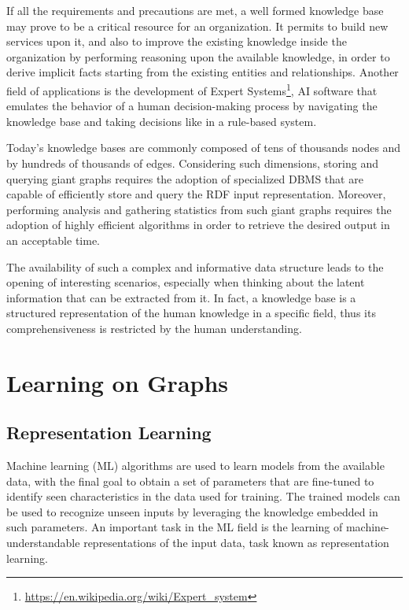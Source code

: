 \documentclass[%
    corpo=13.5pt,
    twoside,
    oldstyle,
    tipotesi=magistrale,
    greek,
    evenboxes
]{toptesi}
\begin{document}
If all the requirements and precautions are met, a well formed knowledge base may
prove to be a critical resource for an organization. It permits to
build new services upon it, and also to improve the existing knowledge inside
the organization by performing reasoning upon the available knowledge, in order
to derive implicit facts starting from the existing entities and relationships.
Another field of applications is the development of Expert Systems\footnote{\url{https://en.wikipedia.org/wiki/Expert_system}},
AI software that emulates the behavior of a human decision-making process by
navigating the knowledge base and taking decisions like in a rule-based system.

Today's knowledge bases are commonly composed of tens of
thousands nodes and by hundreds of thousands of edges.
Considering such dimensions, storing and querying giant graphs requires
the adoption of
specialized DBMS that are capable of efficiently store and query the RDF
input representation. Moreover, performing analysis and gathering statistics
from such giant graphs requires the adoption of highly efficient algorithms in
order to retrieve the desired output in an acceptable time.

The availability of such a complex and informative data structure leads
to the opening of interesting scenarios, especially when thinking about
the latent information that can be extracted from it. In
fact, a knowledge base is a structured representation of the
human knowledge in a specific field, thus its comprehensiveness is restricted
by the human understanding.


\section{Learning on Graphs}
\label{sec:learninggraphs}

\subsection{Representation Learning}

Machine learning (ML) algorithms are used to learn models from the
available data, with the final goal to obtain a set of parameters
that are fine-tuned to identify seen characteristics in the data
used for training. The trained models can be used to
recognize unseen inputs by leveraging the knowledge embedded
in such parameters.
An important task in the ML field is the learning of machine-understandable
representations of the input data, task known as representation learning.
\end{document}
